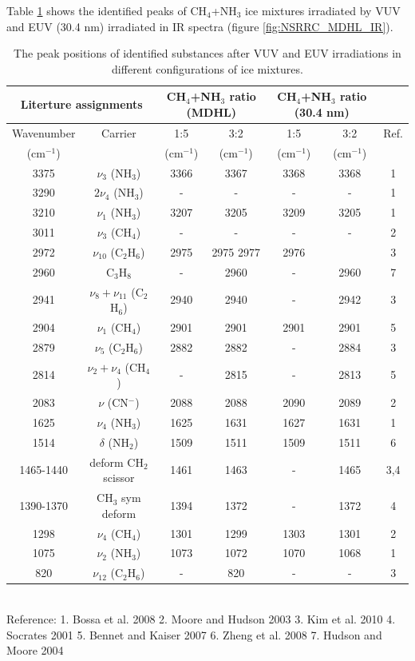 Table \ref{tab:WavenumberNSRRC} shows the identified peaks of CH$_4$+NH$_3$ ice mixtures irradiated by VUV and EUV (30.4 nm) irradiated in IR spectra (figure \ref{fig:NSRRC_MDHL_IR}).

\begin{table}[htbp]
\caption{The peak positions of identified substances after VUV and EUV irradiations in different configurations of ice mixtures.}
\label{tab:WavenumberNSRRC}
\begin{tabular}{ccccccc}
\hline
\hline
\multicolumn{2}{c}{Literture assignments} & \multicolumn{2}{c}{CH$_4$+NH$_3$ ratio (MDHL)} & \multicolumn{2}{c}{CH$_4$+NH$_3$ ratio (30.4 nm)} \\
\hline
Wavenumber & Carrier  & 1:5 & 3:2 & 1:5 & 3:2 & Ref. \\
(cm$^{-1}$) &   & (cm$^{-1}$) & (cm$^{-1}$) & (cm$^{-1}$) & (cm$^{-1}$) &\\
\hline
3375 & $\nu_3$ (NH$_3$) & 3366 & 3367 & 3368 & 3368 & 1 \\
3290 & $2\nu_4$ (NH$_3$) & - & - & - & - & 1 \\
3210 & $\nu_1$ (NH$_3$) & 3207 & 3205 & 3209 & 3205 &1 \\
3011 & $\nu_3$ (CH$_4$) & - & - & - & - & 2 \\
2972 & $\nu_{10}$ (C$_2$H$_6$) & 2975 & 2975 2977 & 2976 & & 3 \\
2960 & C$_3$H$_8$ & - & 2960 & - & 2960 & 7 \\
2941 & $\nu_8+\nu_11$ (C$_2$H$_6$) & 2940 & 2940 & - & 2942 & 3 \\
2904 & $\nu_1$ (CH$_4$) & 2901 & 2901 & 2901 & 2901 & 5 \\
2879 & $\nu_5$ (C$_2$H$_6$) & 2882 & 2882 & - & 2884&  3 \\
2814 & $\nu_2+\nu_4$ (CH$_4$) & - & 2815 & - & 2813 & 5 \\
2083 & $\nu$ (CN$^-$) & 2088  & 2088 & 2090 & 2089 & 2 \\
1625 & $\nu_4$ (NH$_3$) & 1625 & 1631 & 1627 & 1631 & 1 \\
1514 & $\delta$ (NH$_2$) & 1509 & 1511 & 1509 & 1511 & 6 \\
1465-1440 & deform CH$_2$ scissor & 1461 & 1463 & - & 1465 & 3,4 \\
1390-1370 & CH$_3$ sym deform & 1394 & 1372 & - & 1372 & 4 \\
1298 & $\nu_4$ (CH$_4$) & 1301 & 1299 & 1303 & 1301 & 2 \\
1075 & $\nu_2$ (NH$_3$) & 1073 & 1072 & 1070 & 1068 & 1 \\
820 & $\nu_12$ (C$_2$H$_6$) & - & 820 & - & - & 3 \\
\hline
\end{tabular}\\
Reference: 1. Bossa et al. 2008 \cite{bossa2008carbamic} 2. Moore and Hudson 2003 \cite{moore2003infrared} 3. Kim et al. 2010 \cite{kim2010abiotic} 4. Socrates 2001 \cite{socrates2001infrared} 5. Bennet and Kaiser 2007 \cite{bennett2007formation} 6. Zheng et al. 2008 \cite{zheng2008formation} 7. Hudson and Moore 2004 \cite{hudson2004reactions}
\end{table}


